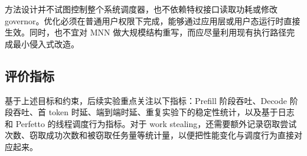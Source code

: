 方法设计并不试图控制整个系统调度器，也不依赖特权接口读取功耗或修改 governor。优化必须在普通用户权限下完成，能够通过应用层或用户态运行时直接生效。同时，也不宜对 MNN 做大规模结构重写，而应尽量利用现有执行路径完成最小侵入式改造。

\subsection{评价指标}

基于上述目标和约束，后续实验重点关注以下指标：Prefill 阶段吞吐、Decode 阶段吞吐、首 token 时延、端到端时延、重复实验下的稳定性统计，以及基于日志和 Perfetto 的线程调度行为指标。对于 work stealing，还需要额外记录窃取尝试次数、窃取成功次数和被窃取任务量等统计量，以便把性能变化与调度行为直接对应起来。
